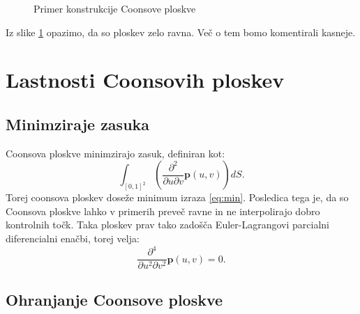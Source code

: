 \documentclass[a4paper,12pt]{article}
\begin{document}
\begin{figure}[ht!]
   \centering
   
   \caption{Primer konstrukcije Coonsove ploskve}
\label{fig:whatever}
\end{figure}
Iz slike \ref{fig:whatever} opazimo, da so ploskev zelo ravna. Več o tem bomo komentirali kasneje.

\section{Lastnosti Coonsovih ploskev}

\subsection{Minimziraje zasuka}
Coonsova ploskve minimzirajo zasuk, definiran kot:
\begin{equation}
   \label{eq:min}
   \int_{[0,1]^2} \left( \frac{\partial^2}{\partial u \partial v}\mathbf{p}(u,v) \right) dS.
\end{equation}
Torej coonsova ploskev doseže minimum izraza \eqref{eq:min}.
Posledica tega je, da so Coonsova ploskve lahko v primerih preveč ravne in ne interpolirajo dobro kontrolnih točk.
Taka ploskev prav tako zadošča Euler-Lagrangovi parcialni diferencialni enačbi, torej velja:
\begin{equation}
   \label{eq:pde}
    \frac{\partial^4}{\partial u^2 \partial v^2}\mathbf{p}(u,v) = 0.
\end{equation}

\subsection{Ohranjanje Coonsove ploskve}
\end{document}
